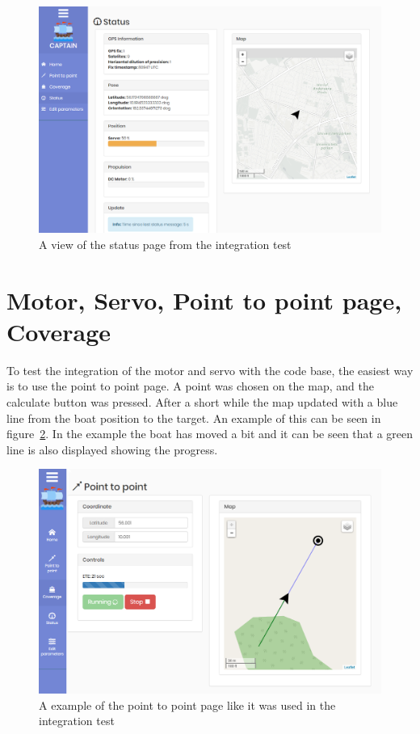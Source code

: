 \begin{figure}[H]
\centering
\includegraphics[width=0.9\linewidth]{Images/Integration/Status_page}
\caption{A view of the status page from the integration test}
\label{fig:integration_statuspage}
\end{figure}


\section{Motor, Servo, Point to point page, Coverage}
To test the integration of the motor and servo with the code base, the easiest way is to use the point to point page. A point was chosen on the map, and the calculate button was pressed. After a short while the map updated with a blue line from the boat position to the target. An example of this can be seen in figure~\ref{fig:pointtopoint}. In the example the boat has moved a bit and it can be seen that a green line is also displayed showing the progress.

\begin{figure}[H]
\centering
\includegraphics[width=0.9\linewidth]{Images/Integration/point_to_point}
\caption{A example of the point to point page like it was used in the integration test}
\label{fig:pointtopoint}
\end{figure}


